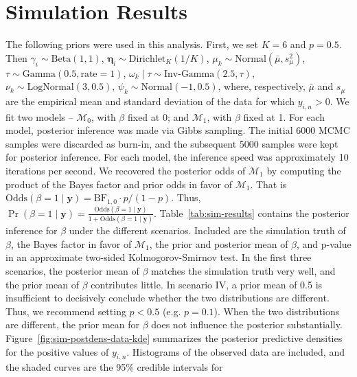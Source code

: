 \documentclass[12pt]{article} %
\newcommand{\Normal}{\text{Normal}}
\newcommand{\Beta}{\text{Beta}}
\newcommand{\G}{\text{Gamma}}
\newcommand{\InvGamma}{\text{Inv-Gamma}}
\newcommand{\Dirichlet}{\text{Dirichlet}}
\newcommand{\LogNormal}{\text{LogNormal}}
\begin{document}
\section{Simulation Results}\label{sec:sim-results}
The following priors were used in this analysis. First, we set $K=6$ and
$p=0.5$. Then $\gamma_i\sim\Beta(1, 1)$, $\bm\eta_i\sim\Dirichlet_K(1/K)$,
$\mu_k\sim\Normal(\bar{\mu}, s_\mu^2)$, $\tau\sim\G(0.5,\text{rate}=1)$,
$\omega_k\mid\tau\sim\InvGamma(2.5, \tau)$, $\nu_k\sim\LogNormal(3, 0.5)$,
$\psi_k\sim\Normal(-1, 0.5)$, where, respectively, $\bar{\mu}$ and $s_\mu$
are the empirical mean and standard deviation of the data for which $y_{i,n}
> 0$.
%
We fit two models -- $\mathcal{M}_0$, with $\beta$ fixed at 0; and
$\mathcal{M}_1$, with $\beta$ fixed at 1. For each model, posterior inference
was made via Gibbs sampling. The initial 6000 MCMC samples were discarded as
burn-in, and the subsequent 5000 samples were kept for posterior inference.
For each model, the inference speed was approximately 10 iterations per
second. We recovered the posterior odds of $\mathcal{M}_1$ by computing the
product of the Bayes factor and prior odds in favor of $\mathcal{M}_1$. That
is $\text{Odds}(\beta=1 \mid \bm y) = \text{BF}_{1,0} \cdot p/(1-p)$. Thus,
$\Pr(\beta=1\mid\bm y) = \frac{\text{Odds}(\beta=1 \mid \bm y)}{1 +
\text{Odds}(\beta=1 \mid \bm y)}$.
%
%
Table~\ref{tab:sim-results} contains the posterior inference for $\beta$
under the different scenarios. Included are the simulation truth of $\beta$,
the Bayes factor in favor of $\mathcal{M}_1$, the prior and posterior mean of
$\beta$, and p-value in an approximate two-sided Kolmogorov-Smirnov test. In
the first three scenarios, the posterior mean of $\beta$ matches the
simulation truth very well, and the prior mean of $\beta$ contributes little.
In scenario IV, a prior mean of 0.5 is insufficient to decisively conclude
whether the two distributions are different. Thus, we recommend setting
$p<0.5$ (e.g. $p=0.1$). When the two distributions are different, the prior mean
for $\beta$ does not influence the posterior substantially.
%
Figure~\ref{fig:sim-postdens-data-kde} summarizes the posterior predictive
densities for the positive values of $y_{i,n}$. Histograms of the observed
data are included, and the shaded curves are the 95\% credible intervals for
\end{document}
